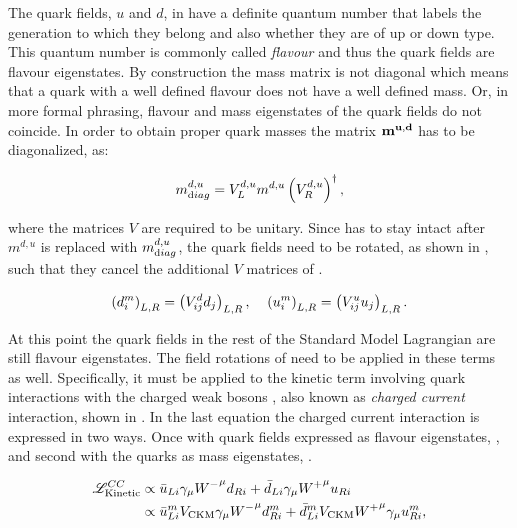 The quark fields, $u$ and $d$,  in  have a definite quantum number that labels the generation to which they belong
and also whether they are of up or down type. This quantum number is commonly called {\it flavour} and thus the quark fields
are flavour eigenstates. By construction the mass matrix is not diagonal which means that
a quark with a well defined flavour does not have a well defined mass. Or, in more formal phrasing, flavour and mass eigenstates of
the quark fields do not coincide. In order to obtain proper quark masses the matrix $\bf m^{u,d}$ has to be diagonalized, as:

\begin{equation}
  \centering
  m^{d,u}_{\text diag} = V_L^{d,u} m^{d,u} \left(V_R^{d,u}\right)^{\dagger},
  \label{diagM}
\end{equation}

\noindent where the matrices $V$ are required to be unitary. Since  has to stay intact after $m^{d,u}$ is replaced with
$m^{d,u}_{\text diag}$, the quark fields need to be rotated, as shown in , such that they cancel the additional $V$ matrices
of .

\begin{equation}
  \centering
  \left( d_{i}^m \right)_{L,R} = \left( V^d_{ij} d_{j} \right)_{L,R}, \;\;\;\; \left( u_{i}^m \right)_{L,R} = \left( V^u_{ij} u_{j} \right)_{L,R}.
  \label{quark_rotation}
\end{equation}

\noindent At this point the quark fields in the rest of the Standard Model Lagrangian are still flavour eigenstates.
The field rotations of  need to be applied in these terms as well. Specifically, it must be
applied to the kinetic term involving quark interactions with the charged weak bosons \Wpm, also known as {\it charged current}
interaction, shown in . In the last equation the charged current interaction is expressed in two ways.
Once with quark fields expressed as flavour eigenstates, , and second with the quarks as mass eigenstates, .

\begin{subequations}
  \centering
  \begin{align}
    \mathscr{L}_{\text{Kinetic}}^{CC} & \propto \bar{u}_{Li} \gamma_\mu {\Wm}^\mu d_{Ri} + \bar{d}_{Li} \gamma_\mu {\Wp}^\mu u_{Ri}  \label{CClagrangianInt} \\
                                      & \propto \bar{u}_{Li}^m  {V_{\text{CKM}}} \gamma_\mu {\Wm}^\mu d_{Ri}^m + \bar{d}_{Li}^m V_{\text{CKM}} {\Wp}^\mu \gamma_\mu u_{Ri}^m, \label{CClagrangianMass}
  \end{align}
  \label{CClagrangian}
\end{subequations}

